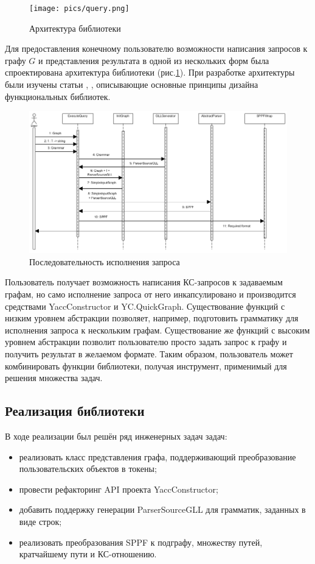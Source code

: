 \documentclass[14pt]{matmex-diploma-custom}
\begin{document}
    \begin{figure}
        \centering
        \texttt{[image: pics/query.png]}
        \caption{Архитектура библиотеки \label{arch_lib}}
    \end{figure}
    Для предоставления конечному пользователю возможности написания запросов к графу \(G\) и представления результата в одной из нескольких форм была спроектирована архитектура библиотеки (рис.\ref{arch_lib}). При разработке архитектуры были изучены статьи \cite{funcdes1}, \cite{funcdes2}, описывающие основные принципы дизайна функциональных библиотек.
    \begin{figure}
        \centering
        \includegraphics[width=\textwidth]{pics/pipeline.png}
        \caption{Последовательность исполнения запроса \label{pipeline}}
    \end{figure}
    Пользователь получает возможность написания КС-запросов к задаваемым графам, но само исполнение запроса от него инкапсулировано и производится средствами YaccConstructor и YC.QuickGraph. Существование функций с низким уровнем абстракции позволяет, например, подготовить грамматику для исполнения запроса к нескольким графам. Существование же функций с высоким уровнем абстракции позволит пользователю просто задать запрос к графу и получить результат в желаемом формате. Таким образом, пользователь может комбинировать функции библиотеки, получая инструмент, применимый для решения множества задач.
    
    \subsection{Реализация библиотеки}
    В ходе реализации был решён ряд инженерных задач задач:
    \begin{itemize}
        \item реализовать класс представления графа, поддерживающий преобразование пользовательских объектов в токены;
        \item провести рефакторинг API проекта YaccConstructor;
        \item добавить поддержку генерации ParserSourceGLL для грамматик, заданных в виде строк;
        \item реализовать преобразования SPPF к подграфу, множеству путей, кратчайшему пути и КС-отношению.
    \end{itemize}
    
\end{document}
